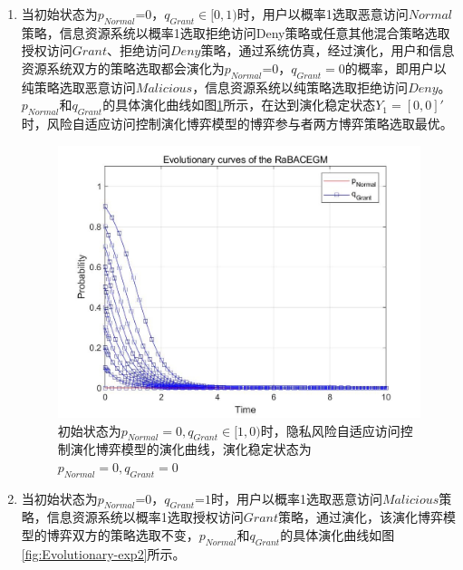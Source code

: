 \begin{enumerate}
 	\item 当初始状态为${{p}_{Normal}}\text{=0}$，${{q}_{Grant}}\in [0,1)$时，用户以概率1选取恶意访问$Normal$策略，信息资源系统以概率1选取拒绝访问Deny策略或任意其他混合策略选取授权访问$Grant$、拒绝访问$Deny$策略，通过系统仿真，经过演化，用户和信息资源系统双方的策略选取都会演化为${{p}_{Normal}}\text{=0}$，${{q}_{Grant}}=0$的概率，即用户以纯策略选取恶意访问$Malicious$，信息资源系统以纯策略选取拒绝访问$Deny$。${{p}_{Normal}}$和${{q}_{Grant}}$的具体演化曲线如图\ref{fig:Evolutionary-exp1}所示，在达到演化稳定状态${{Y}_{1}}=[0,0]'$时，风险自适应访问控制演化博弈模型的博弈参与者两方博弈策略选取最优。
 	
 	 \begin{figure}[htbp]
 		\centering
 		\includegraphics[width=0.8\linewidth]{./figures/Evolutionary-exp1.jpg}
 		\centering
 		\caption{初始状态为$p_{Normal}=0,q_{Grant}∈[1,0)$时，隐私风险自适应访问控制演化博弈模型的演化曲线，演化稳定状态为$p_{Normal}=0, q_{Grant}=0$}\label{fig:Evolutionary-exp1}
 	\end{figure}
 
 	\item 当初始状态为${{p}_{Normal}}\text{=0}$，${{q}_{Grant}}\text{=}1$时，用户以概率1选取恶意访问$Malicious$策略，信息资源系统以概率1选取授权访问$Grant$策略，通过演化，该演化博弈模型的博弈双方的策略选取不变，${{p}_{Normal}}$和${{q}_{Grant}}$的具体演化曲线如图\ref{fig:Evolutionary-exp2}所示。
 	

\end{enumerate}
